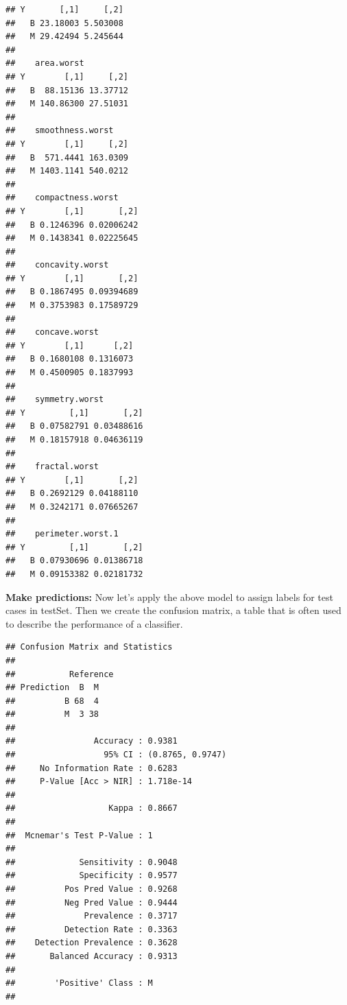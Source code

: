 \documentclass[]{article}
\newenvironment{Shaded}{\begin{snugshade}}{\end{snugshade}}
\newcommand{\CommentTok}[1]{\textcolor[rgb]{0.56,0.35,0.01}{\textit{#1}}}
\newcommand{\DataTypeTok}[1]{\textcolor[rgb]{0.13,0.29,0.53}{#1}}
\newcommand{\DecValTok}[1]{\textcolor[rgb]{0.00,0.00,0.81}{#1}}
\newcommand{\KeywordTok}[1]{\textcolor[rgb]{0.13,0.29,0.53}{\textbf{#1}}}
\newcommand{\NormalTok}[1]{#1}
\newcommand{\OperatorTok}[1]{\textcolor[rgb]{0.81,0.36,0.00}{\textbf{#1}}}
\newcommand{\StringTok}[1]{\textcolor[rgb]{0.31,0.60,0.02}{#1}}
\begin{document}
\begin{verbatim}
## Y       [,1]     [,2]
##   B 23.18003 5.503008
##   M 29.42494 5.245644
## 
##    area.worst
## Y        [,1]     [,2]
##   B  88.15136 13.37712
##   M 140.86300 27.51031
## 
##    smoothness.worst
## Y        [,1]     [,2]
##   B  571.4441 163.0309
##   M 1403.1141 540.0212
## 
##    compactness.worst
## Y        [,1]       [,2]
##   B 0.1246396 0.02006242
##   M 0.1438341 0.02225645
## 
##    concavity.worst
## Y        [,1]       [,2]
##   B 0.1867495 0.09394689
##   M 0.3753983 0.17589729
## 
##    concave.worst
## Y        [,1]      [,2]
##   B 0.1680108 0.1316073
##   M 0.4500905 0.1837993
## 
##    symmetry.worst
## Y         [,1]       [,2]
##   B 0.07582791 0.03488616
##   M 0.18157918 0.04636119
## 
##    fractal.worst
## Y        [,1]       [,2]
##   B 0.2692129 0.04188110
##   M 0.3242171 0.07665267
## 
##    perimeter.worst.1
## Y         [,1]       [,2]
##   B 0.07930696 0.01386718
##   M 0.09153382 0.02181732
\end{verbatim}

\textbf{Make predictions:} Now let's apply the above model to assign
labels for test cases in testSet. Then we create the confusion matrix, a
table that is often used to describe the performance of a classifier.

\begin{Shaded}
\end{Shaded}

\begin{verbatim}
## Confusion Matrix and Statistics
## 
##           Reference
## Prediction  B  M
##          B 68  4
##          M  3 38
##                                           
##                Accuracy : 0.9381          
##                  95% CI : (0.8765, 0.9747)
##     No Information Rate : 0.6283          
##     P-Value [Acc > NIR] : 1.718e-14       
##                                           
##                   Kappa : 0.8667          
##                                           
##  Mcnemar's Test P-Value : 1               
##                                           
##             Sensitivity : 0.9048          
##             Specificity : 0.9577          
##          Pos Pred Value : 0.9268          
##          Neg Pred Value : 0.9444          
##              Prevalence : 0.3717          
##          Detection Rate : 0.3363          
##    Detection Prevalence : 0.3628          
##       Balanced Accuracy : 0.9313          
##                                           
##        'Positive' Class : M               
## 
\end{verbatim}
\end{document}
